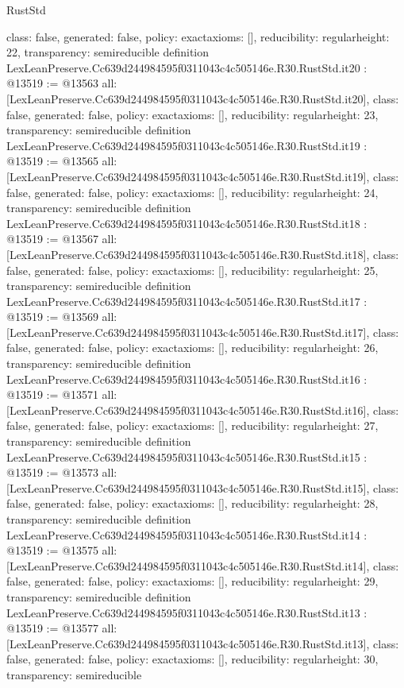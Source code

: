 \begin{lexlean}{RustStd}
\begin{coremodule}
{  class: false,
  generated: false,
  policy: exact{axioms: []},
  reducibility: regular{height: 22},
  transparency: semireducible
}
definition LexLeanPreserve.Cc639d244984595f0311043c4c505146e.R30.RustStd.it20 : @13519 := @13563 {
  all: [LexLeanPreserve.Cc639d244984595f0311043c4c505146e.R30.RustStd.it20],
  class: false,
  generated: false,
  policy: exact{axioms: []},
  reducibility: regular{height: 23},
  transparency: semireducible
}
definition LexLeanPreserve.Cc639d244984595f0311043c4c505146e.R30.RustStd.it19 : @13519 := @13565 {
  all: [LexLeanPreserve.Cc639d244984595f0311043c4c505146e.R30.RustStd.it19],
  class: false,
  generated: false,
  policy: exact{axioms: []},
  reducibility: regular{height: 24},
  transparency: semireducible
}
definition LexLeanPreserve.Cc639d244984595f0311043c4c505146e.R30.RustStd.it18 : @13519 := @13567 {
  all: [LexLeanPreserve.Cc639d244984595f0311043c4c505146e.R30.RustStd.it18],
  class: false,
  generated: false,
  policy: exact{axioms: []},
  reducibility: regular{height: 25},
  transparency: semireducible
}
definition LexLeanPreserve.Cc639d244984595f0311043c4c505146e.R30.RustStd.it17 : @13519 := @13569 {
  all: [LexLeanPreserve.Cc639d244984595f0311043c4c505146e.R30.RustStd.it17],
  class: false,
  generated: false,
  policy: exact{axioms: []},
  reducibility: regular{height: 26},
  transparency: semireducible
}
definition LexLeanPreserve.Cc639d244984595f0311043c4c505146e.R30.RustStd.it16 : @13519 := @13571 {
  all: [LexLeanPreserve.Cc639d244984595f0311043c4c505146e.R30.RustStd.it16],
  class: false,
  generated: false,
  policy: exact{axioms: []},
  reducibility: regular{height: 27},
  transparency: semireducible
}
definition LexLeanPreserve.Cc639d244984595f0311043c4c505146e.R30.RustStd.it15 : @13519 := @13573 {
  all: [LexLeanPreserve.Cc639d244984595f0311043c4c505146e.R30.RustStd.it15],
  class: false,
  generated: false,
  policy: exact{axioms: []},
  reducibility: regular{height: 28},
  transparency: semireducible
}
definition LexLeanPreserve.Cc639d244984595f0311043c4c505146e.R30.RustStd.it14 : @13519 := @13575 {
  all: [LexLeanPreserve.Cc639d244984595f0311043c4c505146e.R30.RustStd.it14],
  class: false,
  generated: false,
  policy: exact{axioms: []},
  reducibility: regular{height: 29},
  transparency: semireducible
}
definition LexLeanPreserve.Cc639d244984595f0311043c4c505146e.R30.RustStd.it13 : @13519 := @13577 {
  all: [LexLeanPreserve.Cc639d244984595f0311043c4c505146e.R30.RustStd.it13],
  class: false,
  generated: false,
  policy: exact{axioms: []},
  reducibility: regular{height: 30},
  transparency: semireducible
}
\end{coremodule}
\end{lexlean}
